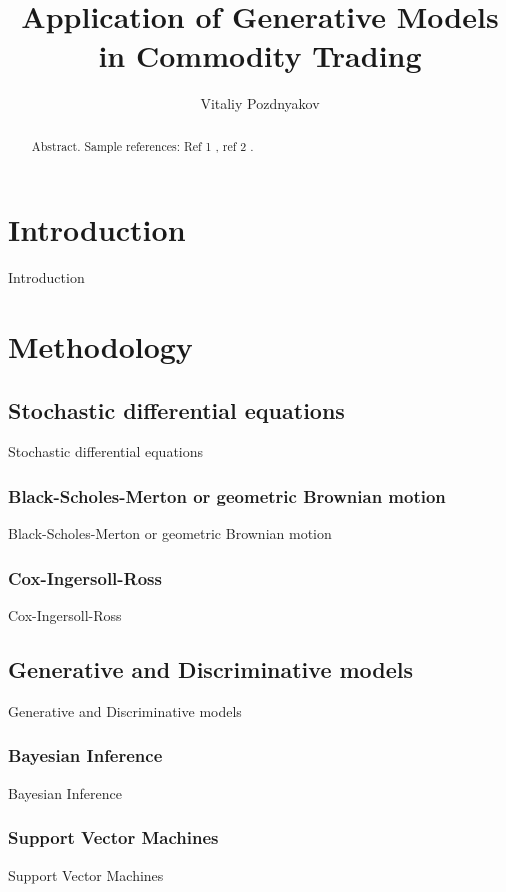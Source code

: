 \documentclass{article}
\title{Application of Generative Models \\ in Commodity Trading}
\author{Vitaliy Pozdnyakov}
\date{}
\begin{document}
\maketitle

\begin{abstract}
    Abstract. Sample references: Ref 1 \cite{renscen}, ref 2 \citet{jebara}.
\end{abstract}

\section{Introduction}
Introduction

\section{Methodology}

\subsection{Stochastic differential equations}

Stochastic differential equations

\subsubsection{Black-Scholes-Merton or geometric Brownian motion}
Black-Scholes-Merton or geometric Brownian motion

\subsubsection{Cox-Ingersoll-Ross}
Cox-Ingersoll-Ross

\subsection{Generative and Discriminative models}
Generative and Discriminative models

\subsubsection{Bayesian Inference}
Bayesian Inference

\subsubsection{Support Vector Machines}
Support Vector Machines
\end{document}
